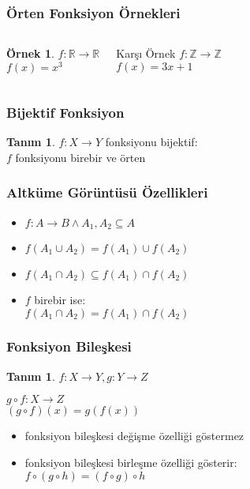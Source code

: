 \documentclass[dvipsnames]{beamer}
\theoremstyle{definition}
\newtheorem{tanim}[theorem]{Tanım}
\theoremstyle{example}
\newtheorem{ornek}[theorem]{Örnek}
\theoremstyle{plain}
\begin{document}
\begin{frame}
  \frametitle{Örten Fonksiyon Örnekleri}

  \begin{columns}
    \begin{ornek}
      $f: \mathbb{R} \rightarrow \mathbb{R}$\\
      $f(x) = x^3$
    \end{ornek}

    \pause
    \begin{block}{Karşı Örnek}
      $f: \mathbb{Z} \rightarrow \mathbb{Z}$\\
      $f(x) = 3x + 1$
    \end{block}
  \end{columns}
\end{frame}

\begin{frame}
  \frametitle{Bijektif Fonksiyon}

  \begin{tanim}
    $f: X \rightarrow Y$ fonksiyonu \alert{bijektif}:\\
    $f$ fonksiyonu birebir ve örten
  \end{tanim}
\end{frame}

\begin{frame}
  \frametitle{Altküme Görüntüsü Özellikleri}

  \begin{itemize}
    \item $f: A \rightarrow B \wedge A_1,A_2 \subseteq A$

    \medskip
    \item $f(A_1 \cup A_2) = f(A_1) \cup f(A_2)$

    \medskip
    \item $f(A_1 \cap A_2) \subseteq f(A_1) \cap f(A_2)$
    \item $f$ birebir ise:\\
      $f(A_1 \cap A_2) = f(A_1) \cap f(A_2)$
  \end{itemize}
\end{frame}

\begin{frame}
  \frametitle{Fonksiyon Bileşkesi}

  \begin{tanim}
    $f: X \rightarrow Y, g: Y \rightarrow Z$

    \medskip
    $g \circ f: X \rightarrow Z$\\
    $(g \circ f)(x) = g(f(x))$
  \end{tanim}

  \pause
  \begin{itemize}
    \item fonksiyon bileşkesi değişme özelliği göstermez
    \item fonksiyon bileşkesi birleşme özelliği gösterir:\\
      $f \circ (g \circ h) = (f \circ g) \circ h$
  \end{itemize}
\end{frame}
\end{document}
